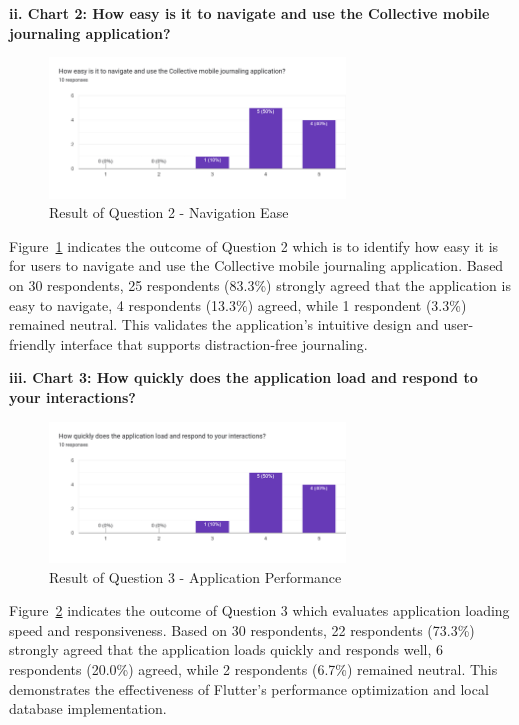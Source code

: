 \textbf{ii. Chart 2: How easy is it to navigate and use the Collective mobile journaling application?}

\begin{figure}[H]
\centering
\includegraphics[width=0.7\textwidth]{files/imgs/survey/chart2_navigation_ease.png}
\caption{Result of Question 2 - Navigation Ease}
\label{fig:chart2-navigation}
\end{figure}

Figure~\ref{fig:chart2-navigation} indicates the outcome of Question 2 which is to identify how easy it is for users to navigate and use the Collective mobile journaling application. Based on 30 respondents, 25 respondents (83.3\%) strongly agreed that the application is easy to navigate, 4 respondents (13.3\%) agreed, while 1 respondent (3.3\%) remained neutral. This validates the application's intuitive design and user-friendly interface that supports distraction-free journaling.

\textbf{iii. Chart 3: How quickly does the application load and respond to your interactions?}

\begin{figure}[H]
\centering
\includegraphics[width=0.7\textwidth]{files/imgs/survey/chart3_performance.png}
\caption{Result of Question 3 - Application Performance}
\label{fig:chart3-performance}
\end{figure}

Figure~\ref{fig:chart3-performance} indicates the outcome of Question 3 which evaluates application loading speed and responsiveness. Based on 30 respondents, 22 respondents (73.3\%) strongly agreed that the application loads quickly and responds well, 6 respondents (20.0\%) agreed, while 2 respondents (6.7\%) remained neutral. This demonstrates the effectiveness of Flutter's performance optimization and local database implementation.

